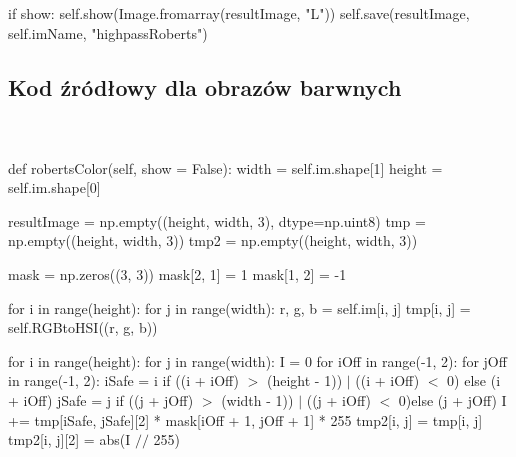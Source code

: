 \documentclass[final,a4paper,openany,12pt]{mwbk}
\begin{document}
if show: \newline
\indent self.show(Image.fromarray(resultImage, "L")) \newline
\indent self.save(resultImage, self.imName, "highpassRoberts") \newline


\newpage
\subsection*{Kod źródłowy dla obrazów barwnych}
\hfill
\\\\
\noindent def robertsColor(self, show = False): \newline
\indent width = self.im.shape[1] \newline
\indent height = self.im.shape[0] \newline

resultImage = np.empty((height, width, 3), dtype=np.uint8) \newline
\indent tmp = np.empty((height, width, 3)) \newline
\indent tmp2 = np.empty((height, width, 3)) \newline

mask = np.zeros((3, 3)) \newline
\indent mask[2, 1] = 1 \newline
\indent mask[1, 2] = -1 \newline

for i in range(height): \newline
\indent for j in range(width): \newline
\indent r, g, b = self.im[i, j] \newline
\indent tmp[i, j] = self.RGBtoHSI((r, g, b)) \newline

for i in range(height): \newline
\indent for j in range(width): \newline
\indent I = 0 \newline
\indent for iOff in range(-1, 2): \newline
\indent for jOff in range(-1, 2): \newline
\indent iSafe = i if ((i + iOff) $>$ (height - 1)) $\mid$ ((i + iOff) $<$ 0) else (i + iOff) \newline
\indent jSafe = j if ((j + jOff) $>$ (width - 1)) $\mid$ ((j + iOff) $<$ 0)else (j + jOff) \newline
\indent I += tmp[iSafe, jSafe][2] * mask[iOff + 1, jOff + 1] * 255 \newline
\indent tmp2[i, j] = tmp[i, j] \newline
\indent tmp2[i, j][2] = abs(I $//$ 255) \newline
\end{document}
